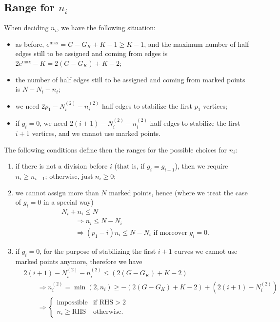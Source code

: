 \documentclass{amsart}
\theoremstyle{plain}
\theoremstyle{definition}
\DeclareMathOperator{\MAX}{max}
\begin{document}
\subsection{Range for $n_i$}

When deciding $n_i$, we have the following situation:
\begin{itemize}
\item as before, $e^{\MAX} = G - G_K + K - 1 \geq K-1$, and the
  maximum number of half edges still to be assigned and coming from
  edges is $2e^{\MAX} - K = 2(G - G_K) + K - 2$;
\item the number of half edges still to be assigned and coming from
  marked points is $N - N_i - n_i$;
\item we need $2p_1 - N^{(2)}_i - n^{(2)}_i$ half edges to
  stabilize the first $p_1$ vertices;
\item if $g_i = 0$, we need $2(i+1) - N^{(2)}_i - n^{(2)}_i$ half
  edges to stabilize the first $i+1$ vertices, and we cannot use
  marked points.
\end{itemize}

The following conditions define then the ranges for the possible
choices for $n_i$:

\begin{enumerate}
\item if there is not a division before $i$ (that is, if $g_i =
  g_{i-1}$), then we require $n_i \geq n_{i-1}$; otherwise, just $n_i
  \geq 0$;
\item we cannot assign more than $N$ marked points, hence (where we
  treat the case of $g_i = 0$ in a special way)
  \begin{align*}
    &N_i + n_i \leq N\\
    &\qquad\Rightarrow n_i \leq N - N_i\\
    &\qquad\Rightarrow (p_1 - i)n_i \leq N - N_i\text{ if moreover $g_i = 0$.}
  \end{align*}
\item if $g_i = 0$, for the purpose of stabilizing the first $i+1$
  curves we cannot use marked points anymore, therefore we have
  \begin{align*}
    &2 (i+1) - N^{(2)}_i - n^{(2)}_i \leq (2(G - G_K) + K - 2)\\
    &\qquad\Rightarrow n^{(2)}_i = \min(2, n_i) \geq - (2(G - G_K) + K - 2) + (2(i+1) - N^{(2)}_i)\\
    &\qquad\Rightarrow
    \begin{cases}
      \text{impossible} & \text{if $\mathrm{RHS} > 2$}\\
      n_i \geq \mathrm{RHS} & \text{otherwise.}
    \end{cases}
  \end{align*}
\end{enumerate}
\end{document}
